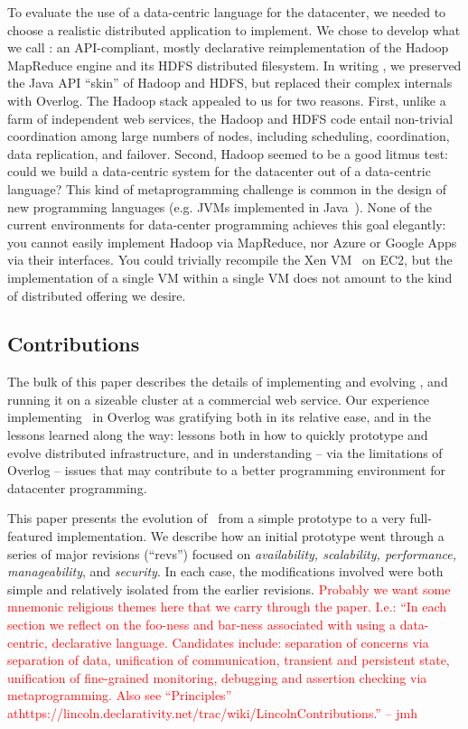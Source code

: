 \documentclass{sig-alternate}
\newcommand{\jmh}[1]{{\textcolor{red}{#1 -- jmh}}}
\begin{document}
To evaluate the use of a data-centric language for the datacenter, we needed to choose a realistic distributed application to implement.  We chose to develop what we call {\em \BOOM}: an API-compliant, mostly declarative reimplementation of the Hadoop MapReduce engine and its HDFS distributed filesystem.  In writing \BOOM, we preserved the Java API ``skin'' of Hadoop and HDFS, but replaced their complex internals with Overlog.  The Hadoop stack appealed to us for two reasons.   First, unlike a farm of independent web services, the Hadoop and HDFS code entail non-trivial coordination among large numbers of nodes, including scheduling, coordination, data replication, and failover.  Second, Hadoop seemed to be a good litmus test: could we build a data-centric system for the datacenter out of a data-centric language?  This kind of metaprogramming challenge is common in the design of new programming languages (e.g. JVMs implemented in Java~\cite{JikesRVMJalapeno,joeq}). None of the current environments for data-center programming achieves this goal elegantly: you cannot easily implement Hadoop via MapReduce, nor Azure or Google Apps via their interfaces.  You could trivially recompile the Xen VM~\cite{xen} on EC2, but the implementation of a single VM within a single VM does not amount to the kind of distributed offering we desire.

\subsection{Contributions}
The bulk of this paper describes the details of implementing and evolving \BOOM, and running it on a sizeable cluster at a commercial web service.  Our experience implementing \BOOM\ in Overlog was gratifying both in its relative ease, and in the lessons learned along the way: lessons both in how to quickly prototype and evolve distributed infrastructure, and in understanding -- via the limitations of Overlog -- issues that may contribute to a better programming environment for datacenter programming.

This paper presents the evolution of \BOOM\ from a simple prototype to a very full-featured implementation.  We describe how an initial prototype went through a series of major revisions (``revs'') focused on {\em availability, scalability, performance, manageability}, and {\em security}.  In each case, the modifications involved were both simple and relatively isolated from the earlier revisions.  \jmh{Probably we want some mnemonic religious themes here that we carry through the paper. I.e.: ``In each section we reflect on the foo-ness and bar-ness associated with using a data-centric, declarative language.  Candidates include: separation of concerns via separation of data, unification of communication, transient and persistent state, unification of fine-grained monitoring, debugging and assertion checking via metaprogramming.  Also see ``Principles'' at\linebreak https://lincoln.declarativity.net/trac/wiki/LincolnContributions.''}
\end{document}
